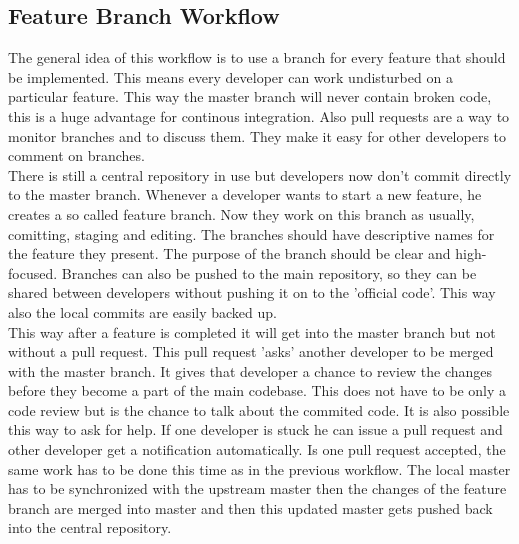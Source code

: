 \subsection{Feature Branch Workflow}
The general idea of this workflow is to use a branch for every feature that should be implemented. This means every developer can work undisturbed on a particular feature.
This way the master branch will never contain broken code, this is a huge advantage for continous integration.
Also pull requests are a way to monitor branches and to discuss them. They make it easy for other developers to comment on branches.
\\
There is still a central repository in use but developers now don't commit directly to the master branch. Whenever a developer wants to start a new feature, he creates a so called feature branch.
Now they work on this branch as usually, comitting, staging and editing. The branches should have descriptive names for the feature they present. 
The purpose of the branch should be clear and  high-focused. Branches can also be pushed to the main repository, so they can be shared between developers 
without pushing it on to the 'official code'. This way also the local commits are easily backed  up.
\\
This way after a feature is completed it will get into the master branch but not without a pull request. This pull request 'asks' another developer to be merged with the master branch.
It gives that developer a chance to review the changes before they become a part of the main codebase. This does not have to be only a code review but is the chance to talk about 
the commited code. It is also possible this way to ask for help. If one developer is stuck he can issue a pull request and other developer get a notification automatically.
Is one pull request accepted, the same work has to be done this time as in the previous workflow. The local master has to be synchronized with the upstream master then the changes 
of the feature branch are merged into master and then this updated master gets pushed back into the central repository.




